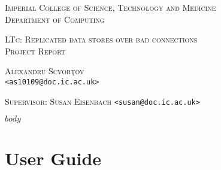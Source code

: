 \documentclass[11pt, a4paper, titlepage]{article}
\makeatletter
\newcommand{\mytitle}{LTc: Replicated data stores over bad connections\\[0.4cm]Project Report}
\newcommand{\myauthor}{Alexandru Scvor\c tov}
\newcommand{\myemail}{\email{<as10109@doc.ic.ac.uk>}}
\newcommand{\email}[1]{\nolinkurl{#1}}
\makeatother
\begin{document}
\begin{titlepage}

  \begin{center}
    \textsc{Imperial College of Science, Technology and Medicine}\\[0.1cm]
    \textsc{Department of Computing}

    \vspace{3cm}

    \textsc{\Large \mytitle}

    \vspace{1cm}

    \textsc{\Large \myauthor}\\[0.1cm]
    \myemail

    \vspace{2cm}

    \textsc{Supervisor: Susan Eisenbach} \email{<susan@doc.ic.ac.uk>}
  \end{center}

\end{titlepage}

$body$

\clearpage


\clearpage
\appendix

\section{User Guide}
\label{sec:user-guide}

\end{document}
